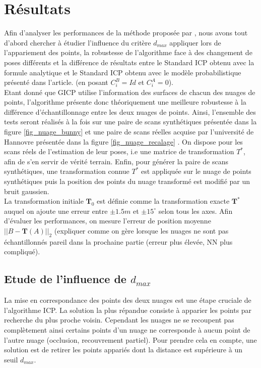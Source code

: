 \section{Résultats}
Afin d'analyser les performances de la méthode proposée par \cite{bib_gicp}, nous avons tout d'abord chercher à étudier l'influence du critère $d_{max}$ appliquer lors de l'appariement des points, la robustesse de l'algorithme face à des changement de poses différents et la différence de résultats entre le Standard ICP obtenu avec la formule analytique et le Standard ICP obtenu avec le modèle probabilistique présenté dans l'article. (en posant $C_{i}^B=Id$ et $C_{i}^A=0$).\\

Etant donné que GICP utilise l'information des surfaces de chacun des nuages de points, l'algorithme présente donc théoriquement une meilleure robustesse à la différence d'échantillonnage entre les deux nuages de points. Ainsi, l'ensemble des tests seront réalisés à la fois sur une paire de scans synthétiques présentée dans la figure \ref{fig_nuage_bunny} et une paire de scans réelles acquise par l'université de Hannovre présentée dans la figure \ref{fig_nuage_recalage} . On dispose pour les scans réels de l'estimation de leur poses, i.e une matrice de transformation $T^*$, afin de s'en servir de vérité terrain. Enfin, pour générer la paire de scans synthétiques, une transformation connue $T^{*}$ est appliquée sur le nuage de points synthétiques puis la position des points du nuage transformé est modifié par un bruit gaussien.\\

La transformation initiale $\mathbf{T}_0$ est définie comme la transformation exacte $\mathbf{T}^*$ auquel on ajoute une erreur entre $\pm1.5m$ et $\pm15^{\circ}$ selon tous les axes. Afin d'évaluer les performances, on mesure l'erreur de position moyenne $||B - \mathbf{T}(A)||_2$ (expliquer comme on gère lorsque les nuages ne sont pas échantillonnés pareil dans la prochaine partie (erreur plus élevée, NN plus compliqué). 
\subsection{Etude de l'influence de $d_{max}$}
La mise en correspondance des points des deux nuages est une étape cruciale de l'algorithme ICP. La solution la plus répandue consiste à apparier les points par recherche du plus proche voisin. Cependant les nuages ne se recoupent pas complètement ainsi certains points d'un nuage ne corresponde à aucun point de l'autre nuage (occlusion, recouvrement partiel). Pour prendre cela en compte, une solution est de retirer les points appariés dont la distance est supérieure à un seuil $d_{max}$.\\

